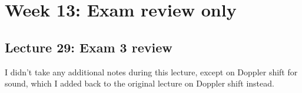 \documentclass[8.01x]{subfiles}
\begin{document}
\chapter{Week 13: Exam review only}

\section{Lecture 29: Exam 3 review}

I didn't take any additional notes during this lecture, except on Doppler shift for sound, which I added back to the original lecture on Doppler shift instead.
\end{document}
